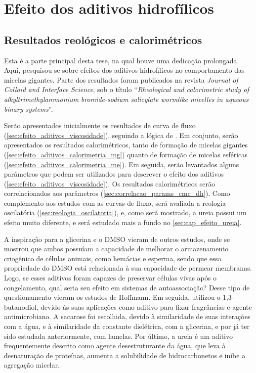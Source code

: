 \part{Efeito dos aditivos hidrofílicos}
	\label{sec:efeito_aditivos_hidrofilicos} 

	\chapter{Resultados reológicos e calorimétricos}
		
	Esta é a parte principal desta tese, na qual houve uma dedicação prolongada. Aqui, pesquisou-se sobre efeitos dos aditivos hidrofílicos no comportamento das micelas gigantes. Parte dos resultados foram publicados na revista \emph{Journal of Colloid and Interface Science}, sob o título ``\emph{Rheological and calorimetric study of alkyltrimethylammonium bromide-sodium salicylate wormlike micelles in aqueous binary systems}"\cite{Clinckspoor2018}.
	
	Serão apresentados inicialmente os resultados de curva de fluxo (\autoref{sec:efeito_aditivos_viscosidade}), seguindo a lógica de \citeauthor{Hoffmann2010}. Em conjunto, serão apresentados os resultados calorimétricos, tanto de formação de micelas gigantes (\autoref{sec:efeito_aditivos_calorimetria_mg}) quanto de formação de micelas esféricas (\autoref{sec:efeito_aditivos_calorimetria_me}). Em seguida, serão levantados alguns parâmetros que podem ser utilizados para descrever o efeito dos aditivos (\autoref{sec:efeito_aditivos_viscosidade}). Os resultados calorimétricos serão correlacionados aos parâmetros (\autoref{sec:correlacao_params_cmc_dh}). Como complemento aos estudos com as curvas de fluxo, será avaliada a reologia oscilatória (\autoref{sec:reologia_oscilatoria}), e, como será mostrado, a ureia possui um efeito muito diferente, e será estudado mais a fundo no \autoref{sec:cap_efeito_ureia}.
	
	A inspiração para a glicerina e o DMSO vieram de outros estudos, onde se mostrou que ambos possuíam a capacidade de melhorar o armazenamento criogênico de células animais, como hemácias e esperma\cite{Butler1959, Polge1949}, sendo que essa propriedade do DMSO está relacionada à sua capacidade de permear membranas\cite{Notman2006}. Logo, se esses aditivos foram capazes de preservar células vivas após o congelamento, qual seria seu efeito em sistemas de autoassociação? Desse tipo de questionamento vieram os estudos de Hoffmann\cite{Grabner2014, Song2008a, Shinto2012}. Em seguida, \citeauthor{Abdel-Rahem2014} utilizou o 1,3-butanodiol, devido às suas aplicações como aditivo para fixar fragrâncias e agente antimicrobiano. A sacarose foi escolhida, devido à similaridade de suas interações com a água, e à similaridade da constante dielétrica, com a glicerina, e por já ter sido estudada anteriormente, com lamelas.\cite{Song2008a} Por último, a ureia é um aditivo frequentemente descrito como agente desestruturante da água, que leva à desnaturação de proteínas, aumenta a solubilidade de hidrocarbonetos e inibe a agregação micelar.\cite{Kuharski1984} 
	
